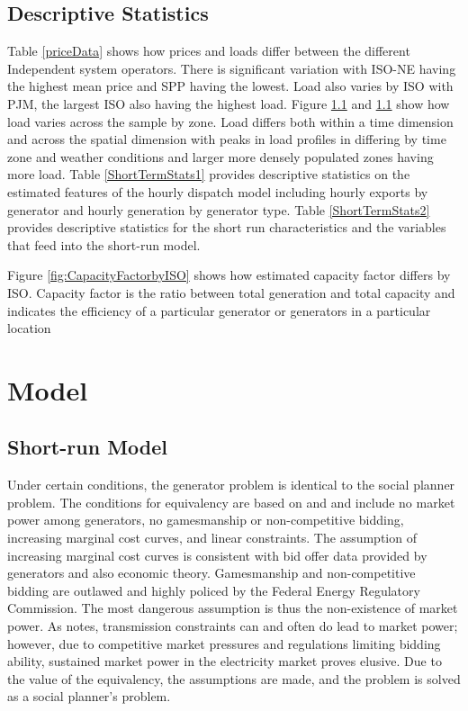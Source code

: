 \documentclass[12pt]{article}
\begin{document}
\subsection{Descriptive Statistics}

Table \ref{priceData} shows how prices and loads differ between the different Independent system operators. There is significant variation with ISO-NE having the highest mean price and SPP having the lowest. Load also varies by ISO with PJM, the largest ISO also having the highest load. Figure \ref{} and \ref{} show how load varies across the sample by zone. Load differs both within a time dimension and across the spatial dimension with peaks in load profiles in differing by time zone and weather conditions and larger more densely populated zones having more load. Table \ref{ShortTermStats1} provides descriptive statistics on the estimated features of the hourly dispatch model including hourly exports by generator and hourly generation by generator type. Table \ref{ShortTermStats2} provides descriptive statistics for the short run characteristics and the variables that feed into the short-run model.

Figure \ref{fig:CapacityFactorbyISO} shows how estimated capacity factor differs by ISO. Capacity factor is the ratio between total generation and total capacity and indicates the efficiency of a particular generator or generators in a particular location

\section{Model} \label{sec:Model}

\subsection{Short-run Model}

Under certain conditions, the generator problem is identical to the social planner problem. The conditions for equivalency are based on \cite{gilbert2004allocating} and \cite{cramton2017electricity} and include no market power among generators, no gamesmanship or non-competitive bidding, increasing marginal cost curves, and linear constraints. The assumption of increasing marginal cost curves is consistent with bid offer data provided by generators and also economic theory. Gamesmanship and non-competitive bidding are outlawed and highly policed by the Federal Energy Regulatory Commission. The most dangerous assumption is thus the non-existence of market power. As \cite{gilbert2004allocating} notes, transmission constraints can and often do lead to market power; however, due to competitive market pressures and regulations limiting bidding ability, sustained market power in the electricity market proves elusive. Due to the value of the equivalency, the assumptions are made, and the problem is solved as a social planner's problem.
\end{document}
